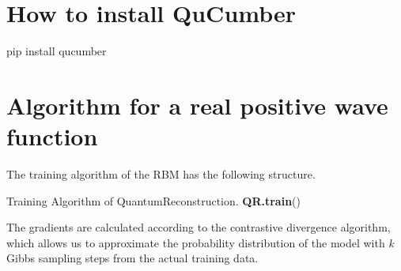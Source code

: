 \documentclass[submission, Phys]{SciPost}
\begin{document}
\begin{appendix}

\section{How to install QuCumber}

\begin{python}
pip install qucumber
\end{python}

\section{Algorithm for a real positive wave function}
The training algorithm of the RBM has the following structure.
 
\begin{algorithm}[H]
	 \caption{Training Algorithm of QuantumReconstruction. \textbf{QR.train}() }
  \SetAlgoLined
 
\end{algorithm}


The gradients are calculated according to the contrastive divergence algorithm, which allows us to approximate the probability distribution of the model with $k$ Gibbs sampling steps from the actual training data.

\begin{algorithm}[H]
	 \caption{Compute Gradient from Batch. \textbf{\lstinline{QR.compute_batch_gradients}}(k, batch, basis) }
  \SetAlgoLined
\end{algorithm}


\end{appendix}
\end{document}
